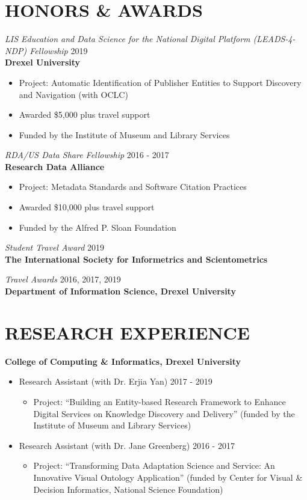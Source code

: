\documentclass[margin, 10pt]{res} %
\begin{document}
\begin{resume}

\section{HONORS \& AWARDS}

{\sl LIS Education and Data Science for the National Digital Platform (LEADS-4-NDP) Fellowship}  \hfill 2019 \\
\textbf{Drexel University}
\begin{itemize}
\item Project: Automatic Identification of Publisher Entities to Support Discovery and Navigation (with OCLC)
\item Awarded \$5,000 plus travel support
\item Funded by the Institute of Museum and Library Services
\end{itemize} 

{\sl RDA/US Data Share Fellowship}  \hfill 2016 - 2017 \\
\textbf{Research Data Alliance}
\begin{itemize}
\item Project: Metadata Standards and Software Citation Practices
\item Awarded \$10,000 plus travel support
\item Funded by the Alfred P. Sloan Foundation
\end{itemize} 

{\sl Student Travel Award} \hfill 2019 \\
\textbf{The International Society for Informetrics and Scientometrics}

{\sl Travel Awards} \hfill 2016, 2017, 2019 \\
\textbf{Department of Information Science, Drexel University}

\section{RESEARCH EXPERIENCE}

\textbf{College of Computing \& Informatics, Drexel University}\\
\begin{itemize}
     \item Research Assistant (with Dr. Erjia Yan) \hfill 2017 - 2019
     \begin{itemize}
     	\item  Project: “Building an Entity-based Research Framework to Enhance Digital Services on Knowledge Discovery and Delivery” (funded by the Institute of Museum and Library Services)
   	\end{itemize}
   	\item Research Assistant (with Dr. Jane Greenberg) \hfill 2016 - 2017
     \begin{itemize}
     	\item  Project: “Transforming Data Adaptation Science and Service: An Innovative Visual Ontology Application” (funded by Center for Visual \& Decision Informatics, National Science Foundation)
   	\end{itemize}
\end{itemize}


\end{resume}
\end{document}
